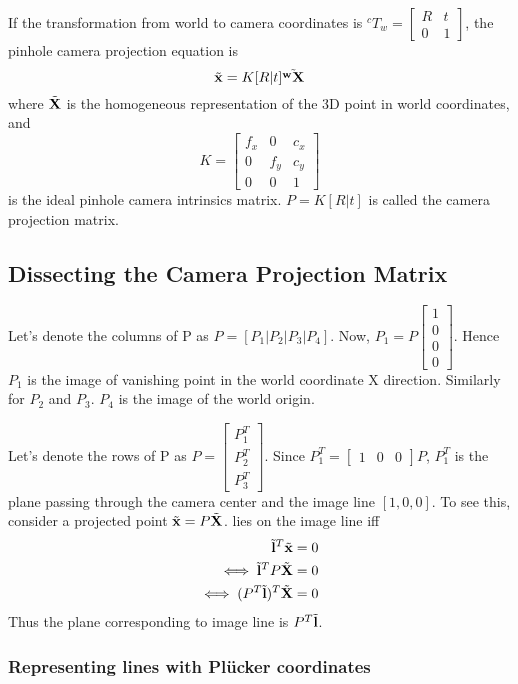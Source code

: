 If the transformation from world to camera coordinates is $^cT_w = \begin{bmatrix}R & t \\0 & 1 \end{bmatrix}$, the pinhole camera projection equation is
\begin{equation}
\tilde{\mathbf{x}} = K [R | t] \tilde{\mathbf{^wX}}
\end{equation}
where $\tilde{\mathbf{X}}$ is the homogeneous representation of the 3D point in world coordinates, and
\begin{equation}
K = \begin{bmatrix}
f_x & 0   & c_x\\
0   & f_y & c_y\\
0   & 0   & 1
\end{bmatrix}
\end{equation}
is the ideal pinhole camera intrinsics matrix. $P = K[R | t]$ is called the camera projection matrix.

\subsection{Dissecting the Camera Projection Matrix}
Let's denote the columns of P as $P = [P_1 | P_2 | P_3 | P_4]$. Now, $P_1 = P \begin{bmatrix}1\\0\\0\\0\end{bmatrix}$. Hence $P_1$ is the image of vanishing point in the world
coordinate X direction. Similarly for $P_2$ and $P_3$. $P_4$ is the image of the world origin.

Let's denote the rows of P as $P = \begin{bmatrix}P_1^T\\P_2^T\\P_3^T\end{bmatrix}$. Since $P_1^T = \begin{bmatrix}1 & 0 & 0\end{bmatrix}P$, $P_1^T$ is the plane passing 
through the camera center and the image line $[1, 0, 0]$. To see this, consider a projected point $\tilde{\mathbf{x}} = P \tilde{\mathbf{X}}$.  lies on the image line  iff
\begin{align}
\tilde{\mathbf{l}}^T\tilde{\mathbf{x}} &= 0\\
\iff \tilde{\mathbf{l}}^TP\tilde{\mathbf{X}} &= 0\\
\iff (P^T\tilde{\mathbf{l}})^T\tilde{\mathbf{X}} &= 0
\end{align}
Thus the plane corresponding to image line  is $P^T\tilde{\mathbf{l}}$.

\subsubsection{Representing lines with Pl\"ucker coordinates}